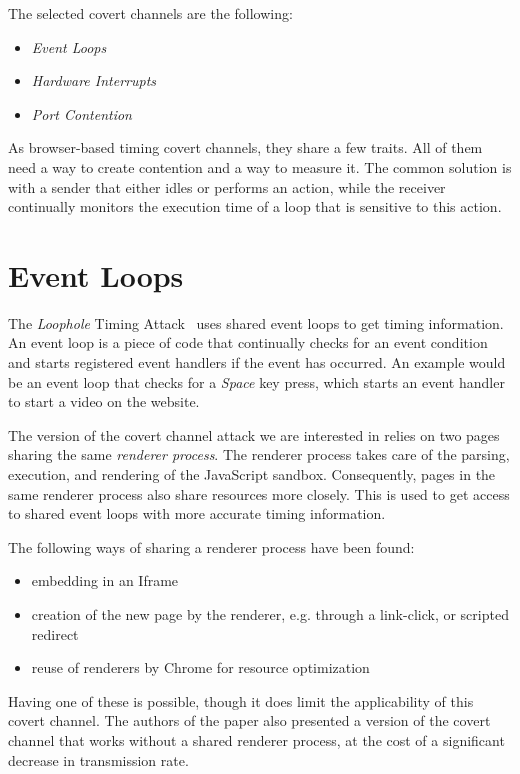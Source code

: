 \documentclass[11pt,
  titlepage=false,
  parskip=half,      %
]{scrreprt}
\begin{document}
\pagebreak
The selected covert channels are the following:
\begin{itemize}
    \item \textit{Event Loops}~\cite{vila2017loophole}
    \item \textit{Hardware Interrupts}~\cite{lipp2017practical}
    \item \textit{Port Contention}~\cite{Rokicki2022webport}
\end{itemize}

As browser-based timing covert channels, they share a few traits.
All of them need a way to create contention and a way to measure it.
The common solution is with a sender that either idles or performs an action,
while the receiver continually monitors the execution time of a loop that is sensitive to this action.

\section{Event Loops}
The \textit{Loophole} Timing Attack~\cite{vila2017loophole} uses shared event loops to get timing information.
An event loop is a piece of code that continually checks for an event condition
and starts registered event handlers if the event has occurred.
An example would be an event loop that checks for a \textit{Space} key press,
which starts an event handler to start a video on the website.

The version of the covert channel attack we are interested in relies on two pages sharing the same \textit{renderer process}.
The renderer process takes care of the parsing, execution, and rendering of the JavaScript sandbox.
Consequently, pages in the same renderer process also share resources more closely.
This is used to get access to shared event loops with more accurate timing information.

The following ways of sharing a renderer process have been found:

\begin{itemize}
    \item embedding in an Iframe
    \item creation of the new page by the renderer, e.g. through a link-click, or scripted redirect
    \item reuse of renderers by Chrome for resource optimization
\end{itemize}

Having one of these is possible, though it does limit the applicability of this covert channel.
The authors of the paper also presented a version of the covert channel that works without a shared renderer process,
at the cost of a significant decrease in transmission rate.
\end{document}
